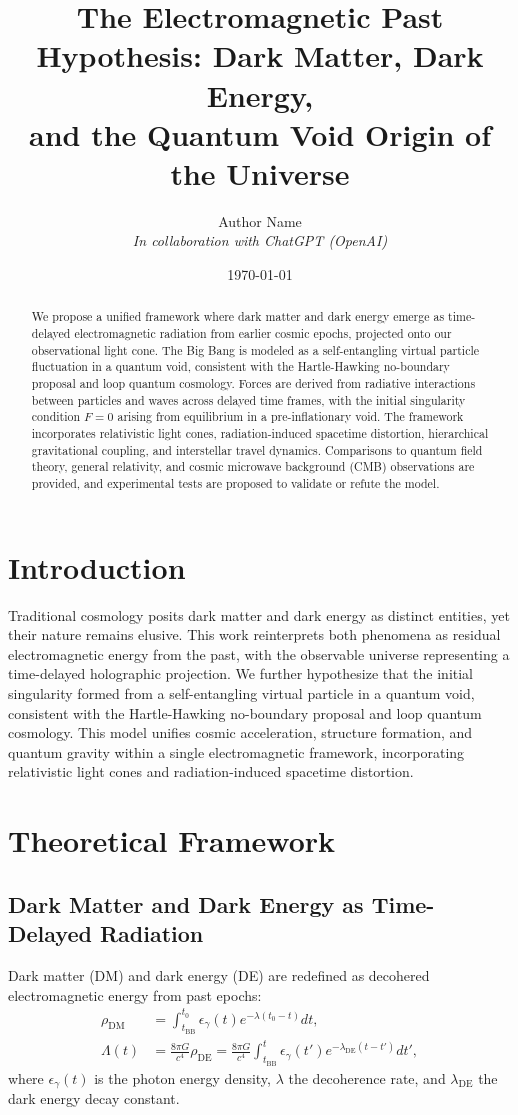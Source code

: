 \documentclass{article}
\title{The Electromagnetic Past Hypothesis: Dark Matter, Dark Energy, \\ and the Quantum Void Origin of the Universe}
\author{Author Name \\ \textit{In collaboration with ChatGPT (OpenAI)}}
\date{\today}
\begin{document}
\maketitle

\begin{abstract}
We propose a unified framework where dark matter and dark energy emerge as time-delayed electromagnetic radiation from earlier cosmic epochs, projected onto our observational light cone. The Big Bang is modeled as a self-entangling virtual particle fluctuation in a quantum void, consistent with the Hartle-Hawking no-boundary proposal and loop quantum cosmology. Forces are derived from radiative interactions between particles and waves across delayed time frames, with the initial singularity condition \( F = 0 \) arising from equilibrium in a pre-inflationary void. The framework incorporates relativistic light cones, radiation-induced spacetime distortion, hierarchical gravitational coupling, and interstellar travel dynamics. Comparisons to quantum field theory, general relativity, and cosmic microwave background (CMB) observations are provided, and experimental tests are proposed to validate or refute the model.
\end{abstract}

\section{Introduction}
Traditional cosmology posits dark matter and dark energy as distinct entities, yet their nature remains elusive. This work reinterprets both phenomena as residual electromagnetic energy from the past, with the observable universe representing a time-delayed holographic projection. We further hypothesize that the initial singularity formed from a self-entangling virtual particle in a quantum void, consistent with the Hartle-Hawking no-boundary proposal and loop quantum cosmology. This model unifies cosmic acceleration, structure formation, and quantum gravity within a single electromagnetic framework, incorporating relativistic light cones and radiation-induced spacetime distortion.

\section{Theoretical Framework}
\subsection{Dark Matter and Dark Energy as Time-Delayed Radiation}
Dark matter (DM) and dark energy (DE) are redefined as decohered electromagnetic energy from past epochs:
\begin{align}
\rho_{\text{DM}} &= \int_{t_{\text{BB}}}^{t_0} \epsilon_{\gamma}(t) e^{-\lambda (t_0 - t)} dt, \label{eq:dm} \\
\Lambda(t) &= \frac{8\pi G}{c^4} \rho_{\text{DE}} = \frac{8\pi G}{c^4} \int_{t_{\text{BB}}}^{t} \epsilon_{\gamma}(t') e^{-\lambda_{\text{DE}} (t - t')} dt', \label{eq:de}
\end{align}
where \( \epsilon_{\gamma}(t) \) is the photon energy density, \( \lambda \) the decoherence rate, and \( \lambda_{\text{DE}} \) the dark energy decay constant.
\end{document}
